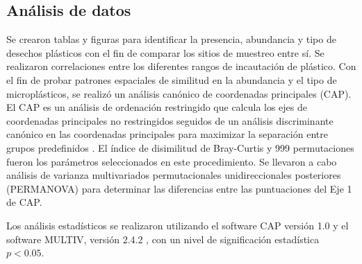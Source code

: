 \subsection{Análisis de datos}
Se crearon tablas y figuras para identificar la presencia, abundancia y tipo de desechos plásticos con el fin de comparar los sitios de muestreo entre sí. Se realizaron correlaciones entre los diferentes rangos de incautación de plástico. Con el fin de probar patrones espaciales de similitud en la abundancia y el tipo de microplásticos, se realizó un análisis canónico de coordenadas principales (CAP). El CAP es un análisis de ordenación restringido que calcula los ejes de coordenadas principales no restringidos seguidos de un análisis discriminante canónico en las coordenadas principales para maximizar la separación entre grupos predefinidos \parencite{anderson2004cap}. El índice de disimilitud de Bray-Curtis y 999 permutaciones fueron los parámetros seleccionados en este procedimiento. Se llevaron a cabo análisis de varianza multivariados permutacionales unidireccionales posteriores (PERMANOVA) \parencite{Anderson2001} para determinar las diferencias entre las puntuaciones del Eje 1 de CAP.

Los análisis estadísticos se realizaron utilizando el software CAP versión 1.0 \parencite{anderson2004cap} y el software MULTIV, versión 2.4.2 \parencite{pillar2006multiv}, con un nivel de significación estadística $p<0.05$.
